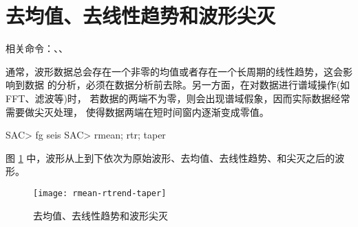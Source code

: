 \section{去均值、去线性趋势和波形尖灭}
相关命令：、、

通常，波形数据总会存在一个非零的均值或者存在一个长周期的线性趋势，这会影响到数据
的分析，必须在数据分析前去除。另一方面，在对数据进行谱域操作(如FFT、滤波等)时，
若数据的两端不为零，则会出现谱域假象，因而实际数据经常需要做尖灭处理，
使得数据两端在短时间窗内逐渐变成零值。

\begin{SACCode}
SAC> fg seis
SAC> rmean; rtr; taper
\end{SACCode}

图 \ref{fig:rmean-rtrend-taper} 中，波形从上到下依次为原始波形、去均值、去线性趋势、和尖灭之后的波形。

\begin{figure}[H]
\centering
\texttt{[image: rmean-rtrend-taper]}
\caption{去均值、去线性趋势和波形尖灭}
\label{fig:rmean-rtrend-taper}
\end{figure}
